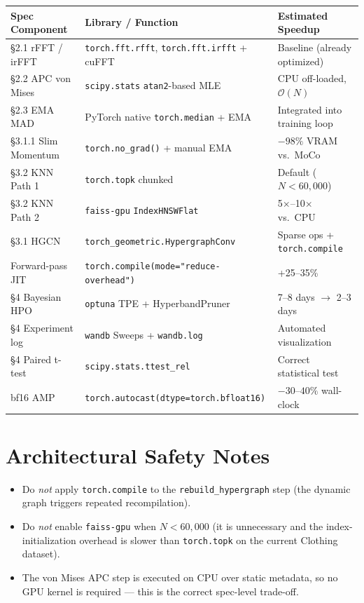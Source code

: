 \documentclass[11pt, a4paper]{article}
\begin{document}
\begin{table}[htbp]
\centering
\renewcommand{\arraystretch}{1.3}
\begin{tabularx}{\linewidth}{|l|X|X|}
\hline
\textbf{Spec Component} & \textbf{Library / Function} & \textbf{Estimated Speedup} \\
\hline
\S2.1 rFFT / irFFT & \texttt{torch.fft.rfft}, \texttt{torch.fft.irfft} + cuFFT & Baseline (already optimized) \\
\hline
\S2.2 APC von Mises & \texttt{scipy.stats} \texttt{atan2}-based MLE & CPU off-loaded, $\mathcal{O}(N)$ \\
\hline
\S2.3 EMA MAD & PyTorch native \texttt{torch.median} + EMA & Integrated into training loop \\
\hline
\S3.1.1 Slim Momentum & \texttt{torch.no\_grad()} + manual EMA & $-98\%$ VRAM vs.\ MoCo \\
\hline
\S3.2 KNN Path 1 & \texttt{torch.topk} chunked & Default ($N < 60{,}000$) \\
\hline
\S3.2 KNN Path 2 & \texttt{faiss-gpu} \texttt{IndexHNSWFlat} & 5$\times$--10$\times$ vs.\ CPU \\
\hline
\S3.1 HGCN & \texttt{torch\_geometric.HypergraphConv} & Sparse ops + \texttt{torch.compile} \\
\hline
Forward-pass JIT & \texttt{torch.compile(mode="reduce-overhead")} & +25--35\% \\
\hline
\S4 Bayesian HPO & \texttt{optuna} TPE + HyperbandPruner & 7--8 days $\rightarrow$ 2--3 days \\
\hline
\S4 Experiment log & \texttt{wandb} Sweeps + \texttt{wandb.log} & Automated visualization \\
\hline
\S4 Paired t-test & \texttt{scipy.stats.ttest\_rel} & Correct statistical test \\
\hline
bf16 AMP & \texttt{torch.autocast(dtype=torch.bfloat16)} & $-30$--$40\%$ wall-clock \\
\hline
\end{tabularx}
\end{table}

\section*{Architectural Safety Notes}

\begin{itemize}
\item Do \emph{not} apply \texttt{torch.compile} to the \texttt{rebuild\_hypergraph} step (the dynamic graph triggers repeated recompilation).
\item Do \emph{not} enable \texttt{faiss-gpu} when $N < 60{,}000$ (it is unnecessary and the index-initialization overhead is slower than \texttt{torch.topk} on the current Clothing dataset).
\item The von Mises APC step is executed on CPU over static metadata, so no GPU kernel is required --- this is the correct spec-level trade-off.
\end{itemize}
\end{document}
